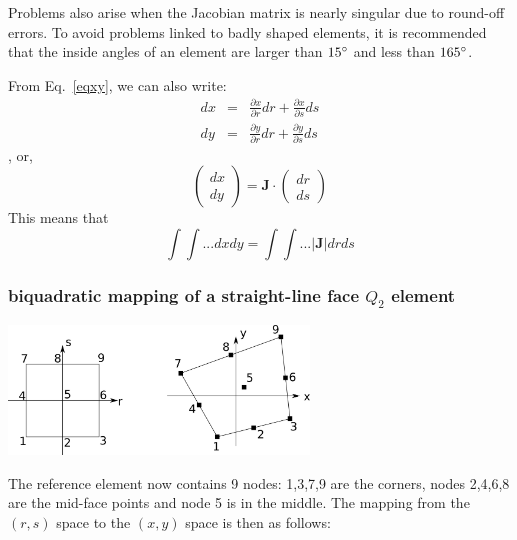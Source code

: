 \begin{remark}
Problems also arise when the Jacobian matrix is nearly singular due to round-off errors.
To avoid problems linked to badly shaped elements, it is recommended that the inside
angles of an element are larger than $15\degree$ and less than $165\degree$.
\end{remark}

From Eq.~\ref{eqxy}, we can also write:
\begin{eqnarray}
dx &=& \frac{\partial x}{\partial r} dr + \frac{\partial x}{\partial s} ds \\
dy &=& \frac{\partial y}{\partial r} dr + \frac{\partial y}{\partial s} ds 
\end{eqnarray},
or, 
\begin{equation}
\left(
\begin{array}{c}
dx \\ dy
\end{array}
\right)
={\bm J}\cdot
\left(
\begin{array}{c}
dr \\ ds
\end{array}
\right)
\end{equation}
This means that 
\begin{equation}
\int \int ... dx dy = \int \int ...|{\bm J}| dr ds
\end{equation}


\subsubsection{biquadratic mapping of a straight-line face $Q_2$ element }

\begin{center}
\includegraphics[width=8cm]{images/mappings/biquadratic/mapping1}
\end{center}

The reference element now contains 9 nodes: 1,3,7,9 are the corners, nodes
2,4,6,8 are the mid-face points and node 5 is in the middle.
The mapping from the $(r,s)$ space to the $(x,y)$ space is then as follows:

